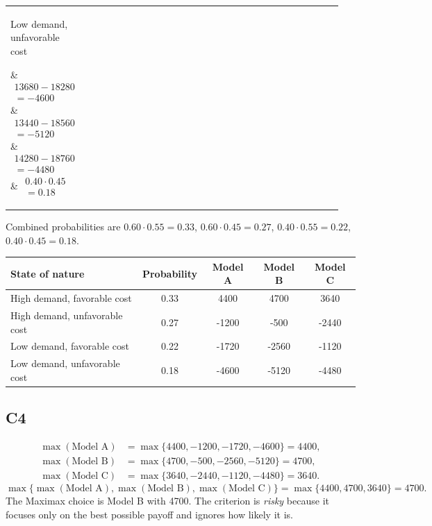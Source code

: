 \begin{ExamProblems}
\begin{center}
\begin{tabular}{p{0.19\linewidth} p{0.19\linewidth} p{0.19\linewidth} p{0.19\linewidth} p{0.19\linewidth}}
			\parbox[t]{\linewidth}{Low demand,\\ unfavorable cost} &
			$\begin{array}{l}
				13680 - 18280\\
				= -4600
			\end{array}$ &
			$\begin{array}{l}
				13440 - 18560\\
				= -5120
			\end{array}$ &
			$\begin{array}{l}
				14280 - 18760\\
				= -4480
			\end{array}$ &
			$\begin{array}{l}
				0.40\cdot 0.45\\
				= 0.18
			\end{array}$ \\
			\bottomrule
		\end{tabular}
	\end{center}
	Combined probabilities are $0.60\cdot 0.55=0.33$, $0.60\cdot 0.45=0.27$, $0.40\cdot 0.55=0.22$, $0.40\cdot 0.45=0.18$.
	\begin{center}
		\begin{tabular}{l c c c c}
			\toprule
			State of nature & Probability & Model A & Model B & Model C \\
			\midrule
			High demand, favorable cost & 0.33 & 4400 & 4700 & 3640 \\
			High demand, unfavorable cost & 0.27 & -1200 & -500 & -2440 \\
			Low demand, favorable cost & 0.22 & -1720 & -2560 & -1120 \\
			Low demand, unfavorable cost & 0.18 & -4600 & -5120 & -4480 \\
			\bottomrule
	\end{tabular}
	\end{center}

		\subsection*{C4}
		\[
		\begin{aligned}
		\max(\text{Model A}) &= \max\{4400,-1200,-1720,-4600\} = 4400,\\
		\max(\text{Model B}) &= \max\{4700,-500,-2560,-5120\} = 4700,\\
		\max(\text{Model C}) &= \max\{3640,-2440,-1120,-4480\} = 3640.
		\end{aligned}
		\]
		\[
		\max\{\max(\text{Model A}), \max(\text{Model B}), \max(\text{Model C})\}
		= \max\{4400, 4700, 3640\}
		= 4700.
		\]
		The Maximax choice is Model B with 4700. The criterion is \emph{risky} because it focuses only on the best possible payoff and ignores how likely it is.


\end{ExamProblems}
